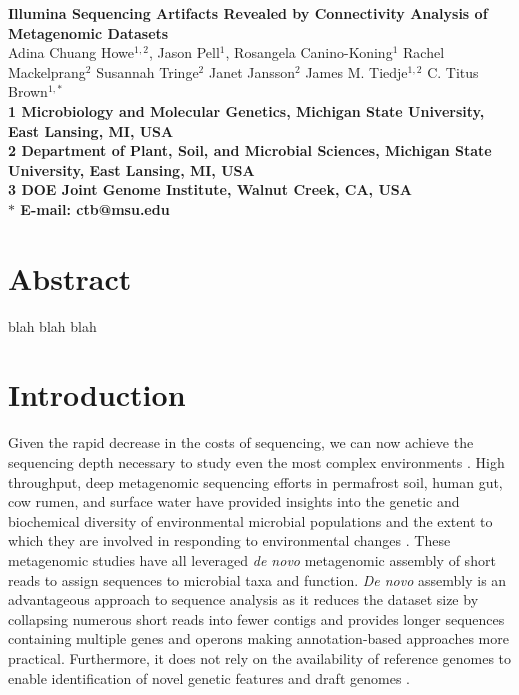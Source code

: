 \documentclass[10pt]{article}
\date{}
\begin{document}
\begin{flushleft}
{\Large
\textbf{Illumina Sequencing Artifacts Revealed by Connectivity Analysis of Metagenomic Datasets}
}
\\
Adina Chuang Howe$^{1,2}$, 
Jason Pell$^{1}$,
Rosangela Canino-Koning$^{1}$
Rachel Mackelprang$^{2}$
Susannah Tringe$^{2}$
Janet Jansson$^{2}$ 
James M. Tiedje$^{1,2}$
C. Titus Brown$^{1,\ast}$
\\
\bf{1} Microbiology and Molecular Genetics, Michigan State University, East Lansing, MI, USA
\\
\bf{2} Department of Plant, Soil, and Microbial Sciences, Michigan State University, East Lansing, MI, USA
\\
\bf{3} DOE Joint Genome Institute, Walnut Creek, CA, USA
\\
$\ast$ E-mail: ctb@msu.edu
\end{flushleft}

\section*{Abstract}
blah blah blah

\section*{Introduction}
Given the rapid decrease in the costs of sequencing, we can now achieve the sequencing depth necessary to study even the most complex environments \cite{Hess:2011p686,Qin:2010p189}.  High throughput, deep metagenomic sequencing efforts in permafrost soil, human gut, cow rumen, and surface water have provided insights into the genetic and biochemical diversity of environmental microbial populations \cite{Hess:2011p686,Iverson:2012p1281,Qin:2010p189} and the extent to which they are involved in responding to environmental changes \cite{Mackelprang:2011p1087}. These metagenomic studies have all leveraged \emph{de novo} metagenomic assembly of short reads to assign sequences to microbial taxa and function.  \emph{De novo} assembly is an advantageous approach to sequence analysis as it reduces the dataset size by collapsing numerous short reads into fewer contigs and provides longer sequences containing multiple genes and operons \cite{Miller:2010p226,Pop:2009p798} making annotation-based approaches more practical.  Furthermore, it does not rely on the availability of reference genomes to enable identification of novel genetic features and draft genomes \cite{Hess:2011p686,Iverson:2012p1281}.
\end{document}
